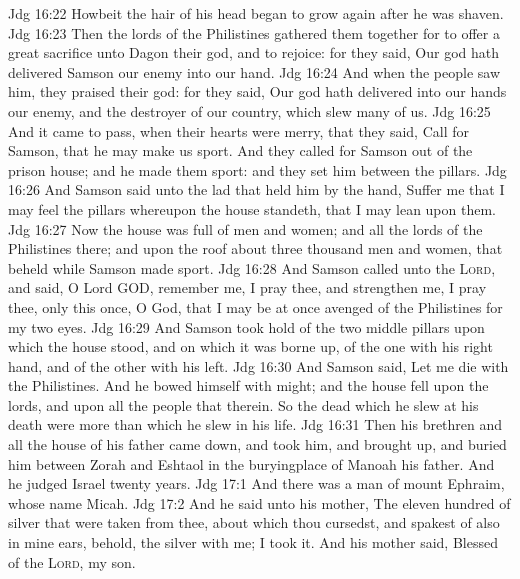 \vs Jdg 16:22 Howbeit the hair of his head began to grow again after he was shaven.
\vs Jdg 16:23 Then the lords of the Philistines gathered them together for to offer a great sacrifice unto Dagon their god, and to rejoice: for they said, Our god hath delivered Samson our enemy into our hand.
\vs Jdg 16:24 And when the people saw him, they praised their god: for they said, Our god hath delivered into our hands our enemy, and the destroyer of our country, which slew many of us.
\vs Jdg 16:25 And it came to pass, when their hearts were merry, that they said, Call for Samson, that he may make us sport. And they called for Samson out of the prison house; and he made them sport: and they set him between the pillars.
\vs Jdg 16:26 And Samson said unto the lad that held him by the hand, Suffer me that I may feel the pillars whereupon the house standeth, that I may lean upon them.
\vs Jdg 16:27 Now the house was full of men and women; and all the lords of the Philistines  there; and  upon the roof about three thousand men and women, that beheld while Samson made sport.
\vs Jdg 16:28 And Samson called unto the \textsc{Lord}, and said, O Lord GOD, remember me, I pray thee, and strengthen me, I pray thee, only this once, O God, that I may be at once avenged of the Philistines for my two eyes.
\vs Jdg 16:29 And Samson took hold of the two middle pillars upon which the house stood, and on which it was borne up, of the one with his right hand, and of the other with his left.
\vs Jdg 16:30 And Samson said, Let me die with the Philistines. And he bowed himself with  might; and the house fell upon the lords, and upon all the people that  therein. So the dead which he slew at his death were more than  which he slew in his life.
\vs Jdg 16:31 Then his brethren and all the house of his father came down, and took him, and brought  up, and buried him between Zorah and Eshtaol in the buryingplace of Manoah his father. And he judged Israel twenty years.
\vs Jdg 17:1 And there was a man of mount Ephraim, whose name  Micah.
\vs Jdg 17:2 And he said unto his mother, The eleven hundred  of silver that were taken from thee, about which thou cursedst, and spakest of also in mine ears, behold, the silver  with me; I took it. And his mother said, Blessed  of the \textsc{Lord}, my son.

